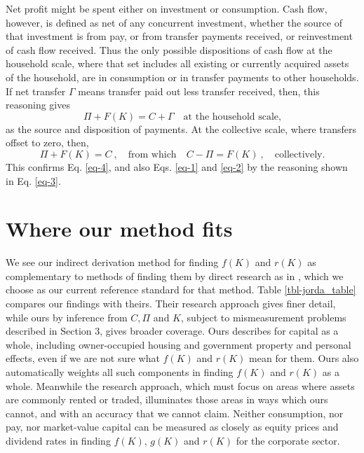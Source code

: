 \documentclass[a4paper,fleqn]{cas-sc}
\begin{document}
Net profit might be spent either on investment or consumption. Cash flow, however, is defined as net of any concurrent investment, whether the source of that investment is from pay, or from transfer payments received, or reinvestment of cash flow received. Thus the only possible dispositions of cash flow at the household scale, where that set includes all existing or currently acquired assets of the household, are in consumption or in transfer payments to other households. If net transfer $\Gamma$ means transfer paid out less transfer received, then, this reasoning gives
\begin{equation}
\Pi + F(K) = C + \Gamma \quad \text{at the household scale,} \label{eq-13}
\end{equation}
as the source and disposition of payments. At the collective scale, where transfers offset to zero, then, 
\begin{equation}
\Pi + F(K) = C \ , \quad \text{from which} \quad C - \Pi = F(K) \ , \quad \text{collectively.} \label{eq-14}
\end{equation}
This confirms Eq. \eqref{eq-4}, and also Eqs. \eqref{eq-1} and \eqref{eq-2} by the reasoning shown in Eq. \eqref{eq-3}.

\section{Where our method fits}

We see our indirect derivation method for finding \(f(K)\) and \(r(K)\) as complementary to methods of finding them by direct research as in \cite{jorda2019}, which we choose as our current reference standard for that method. Table \ref{tbl-jorda_table} compares our findings with theirs. Their research approach gives finer detail, while ours by inference from \(C,\Pi\) and \(K\), subject to mismeasurement problems described in Section 3, gives broader coverage. Ours describes for capital as a whole, including owner-occupied housing and government property and personal effects, even if we are not sure what \(f(K)\) and \(r(K)\) mean for them. Ours also automatically weights all such components in finding \(f(K)\) and \(r(K)\) as a whole. Meanwhile the research approach, which must focus on areas where assets are commonly rented or traded, illuminates those areas in ways which ours cannot, and with an accuracy that we cannot claim. Neither consumption, nor pay, nor market-value capital can be measured as closely as equity prices and dividend rates in finding \(f(K)\), \(g(K)\) and \(r(K)\) for the corporate sector.
\end{document}
